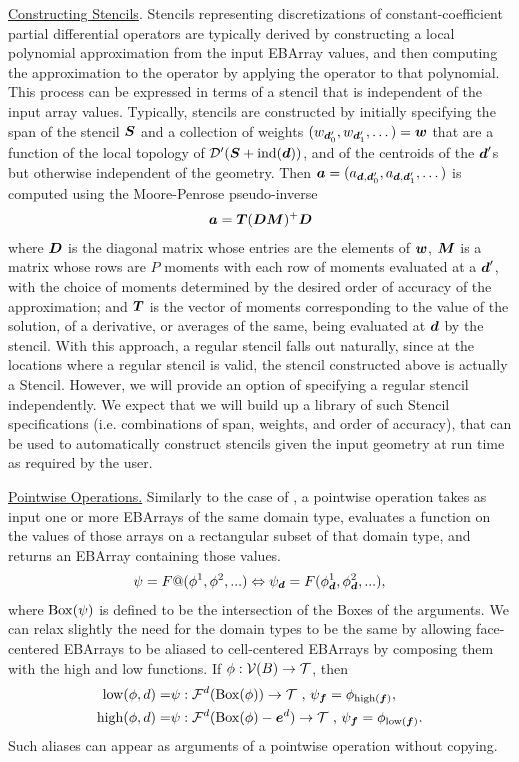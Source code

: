 \documentclass[12pt]{article}
\newcommand{\ind}{{\rm{ind}}}
\newcommand{\low}{{\rm{low}}}
\newcommand{\high}{{\rm{high}}}
\newcommand{\face}{{\mbf{f}}}
\newcommand{\dgen}{{\mbf{d}}}
\begin{document}
\noindent 
\underline{Constructing Stencils}.
Stencils representing discretizations of constant-coefficient partial differential operators are typically derived by constructing a local polynomial approximation from the input EBArray values, and then computing the approximation to the operator by applying the operator to that polynomial. This process can be expressed in terms of a stencil that is independent of the input array values. Typically, stencils are constructed by initially specifying the span of the stencil ${\boldsymbol{S}}$ and a collection of weights $(w_{\dgen_0'},w_{\dgen_1'}, \dots ) = \mbf{w}$ that are a function of the local topology of $\mcl{D}'(\mbf{S} + \ind(\dgen))$, and of the centroids of the $\dgen'$s  but otherwise independent of the geometry. Then $\mbf{a} = (a_{\dgen,\dgen_0'}, a_{\dgen,\dgen_1'}, \dots )$ is computed using the Moore-Penrose pseudo-inverse
\begin{gather*}
{\boldsymbol{a}} = {\boldsymbol{T}} ({\boldsymbol{D}} {\boldsymbol{M}})^+ {\boldsymbol{D}}
\end{gather*}
where ${\boldsymbol{D}}$ is the diagonal matrix whose entries are the elements of ${\boldsymbol{w}}$, ${\boldsymbol{M}}$ is a matrix whose rows are $P$ moments with each row of moments evaluated at a $\dgen'$, with the choice of moments determined by the desired order of accuracy of the approximation; and ${\boldsymbol{T}}$ is the vector of moments corresponding to the value of the solution, of a derivative, or averages of the same, being evaluated at $\dgen$ by the stencil. With this approach, a regular stencil falls out naturally, since at the locations where a regular stencil is valid, the stencil constructed above is actually a \libname Stencil. However, we will provide an option of specifying a regular stencil independently. We expect that we will build up a library of such Stencil specifications (i.e. combinations of span, weights, and order of accuracy), that can be used to automatically construct stencils given the input geometry at run time as required by the user.

\noindent
\underline{Pointwise Operations.} Similarly to the case of , a pointwise operation takes as input one or more EBArrays of the same domain type, evaluates a function on the values of those arrays on a rectangular subset of that domain type, and returns an EBArray containing those values. 
\begin{gather*}
\psi = F@(\phi^{1},\phi^2, ...) \Leftrightarrow \psi_{\dgen} = F(\phi_\dgen^1,\phi_\dgen^2, ...), \label{eqn:pointwise}
\end{gather*}
where ${\rm Box}(\psi)$ is defined to be the intersection of the Boxes of the arguments.
We can relax slightly the need for the domain types to be the same by allowing face-centered EBArrays to be aliased to cell-centered EBArrays by composing them with the high and low functions. If $\phi:{\mathcal{V}}(B) \rightarrow {\mathcal{T}}$, then
\begin{align*}
\low(\phi,d) = & \psi:\mcl{F}^d(\MBox(\phi)) \rightarrow \mcl{T} \cma \psi_\face = \phi_{\high(\face)}, \\ 
\high(\phi,d) = & \psi:\mcl{F}^d(\MBox(\phi)- \mbf{e}^d) \rightarrow \mcl{T} \cma \psi_\face = \phi_{\low(\face)}.
\end{align*}
Such aliases can appear as arguments of a pointwise operation without copying.
\end{document}
